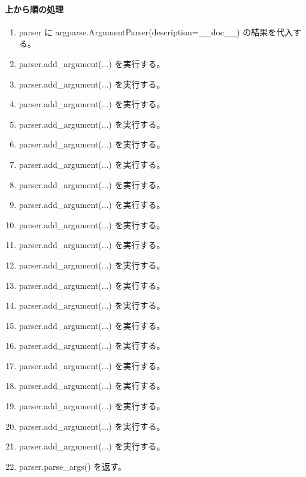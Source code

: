 \documentclass[a4paper,11pt]{article}
\begin{document}
            \paragraph{上から順の処理}
            \begin{enumerate}[leftmargin=1.8em]
            \item parser に argparse.ArgumentParser(description=\_\_doc\_\_) の結果を代入する。
\item parser.add\_argument(...) を実行する。
\item parser.add\_argument(...) を実行する。
\item parser.add\_argument(...) を実行する。
\item parser.add\_argument(...) を実行する。
\item parser.add\_argument(...) を実行する。
\item parser.add\_argument(...) を実行する。
\item parser.add\_argument(...) を実行する。
\item parser.add\_argument(...) を実行する。
\item parser.add\_argument(...) を実行する。
\item parser.add\_argument(...) を実行する。
\item parser.add\_argument(...) を実行する。
\item parser.add\_argument(...) を実行する。
\item parser.add\_argument(...) を実行する。
\item parser.add\_argument(...) を実行する。
\item parser.add\_argument(...) を実行する。
\item parser.add\_argument(...) を実行する。
\item parser.add\_argument(...) を実行する。
\item parser.add\_argument(...) を実行する。
\item parser.add\_argument(...) を実行する。
\item parser.add\_argument(...) を実行する。
\item parser.parse\_args() を返す。
            \end{enumerate}
\end{document}

